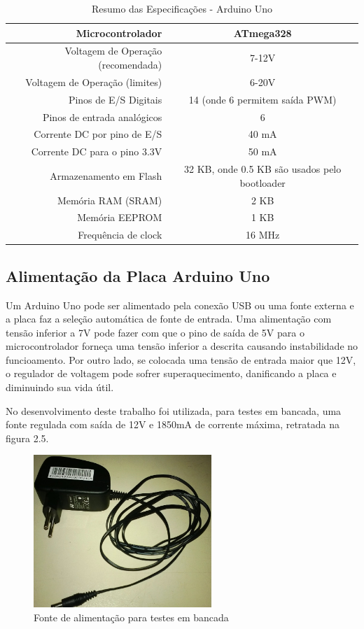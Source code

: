 \begin{table}[!h]
	\begin{tabular}{|r|c|}
		\hline
			Microcontrolador & ATmega328
		\\
		\hline
			Voltagem de Operação (recomendada) & 7-12V
		\\
		\hline
			Voltagem de Operação (limites) & 6-20V
		\\
		\hline
			Pinos de E/S Digitais & 14 (onde 6 permitem saída PWM)
		\\
		\hline
			Pinos de entrada analógicos & 6
		\\
		\hline
			Corrente DC por pino de E/S & 40 mA
		\\
		\hline
			Corrente DC para o pino 3.3V & 50 mA
		\\
		\hline
			Armazenamento em Flash & 32 KB, onde 0.5 KB são usados pelo bootloader
		\\
		\hline
			Memória RAM (SRAM) & 2 KB
		\\
		\hline
			Memória EEPROM & 1 KB
		\\
		\hline
			Frequência de clock & 16 MHz
		\\
\hline
\end{tabular}
\caption{Resumo das Especificações - Arduino Uno}
\end{table}

\subsection{Alimentação da Placa Arduino Uno}

Um Arduino Uno pode ser alimentado pela conexão USB ou uma fonte externa e a placa faz a seleção automática de fonte de entrada. Uma alimentação com tensão inferior a 7V pode fazer com que o pino de saída de 5V para o microcontrolador forneça uma tensão inferior a descrita causando instabilidade no funcioamento. Por outro lado, se colocada uma tensão de entrada maior que 12V, o regulador de voltagem pode sofrer superaquecimento, danificando a placa e diminuindo sua vida útil.

No desenvolvimento deste trabalho foi utilizada, para testes em bancada, uma fonte regulada com saída de 12V e 1850mA de corrente máxima, retratada na figura 2.5.

\begin{figure}[h!]
			\centering
			\includegraphics[width=0.6\textwidth]{figures/fonteAlim.jpg}
			\caption{Fonte de alimentação para testes em bancada}
			\label{1}
\end{figure}

